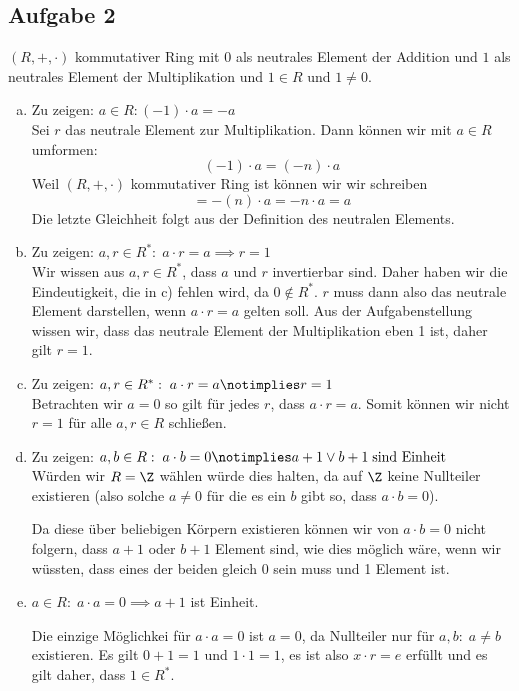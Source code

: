 \subsection*{Aufgabe 2}
$(R, +, \cdot)$ kommutativer Ring mit $0$ als neutrales Element der Addition und $1$ als neutrales Element der Multiplikation und $1 \in R$ und $1 \neq 0$.

\begin{enumerate}[a)]
  \item Zu zeigen: $a \in R: (-1) \cdot a = -a$ \\

  Sei $r$ das neutrale Element zur Multiplikation. Dann können wir mit $a \in R$ umformen:
  \[ (-1) \cdot a = (-n) \cdot a \]
  Weil $(R, +, \cdot)$ kommutativer Ring ist können wir wir schreiben
  \[
    = -(n) \cdot a = -n \cdot a = a
  \]
  Die letzte Gleichheit folgt aus der Definition des neutralen Elements.

  \item Zu zeigen: $  a,r \in R^{*}: \; a \cdot r = a \implies r = 1$ \\

  Wir wissen aus $a, r \in R^{*}$, dass $a$ und $r$ invertierbar sind. Daher haben wir die Eindeutigkeit, die in c) fehlen wird, da $0 \notin R^{*}$. $r$ muss dann also das neutrale Element darstellen, wenn $a \cdot r = a$ gelten soll. Aus der Aufgabenstellung wissen wir, dass das neutrale Element der Multiplikation eben 1 ist, daher gilt $r=1$.

  \item Zu zeigen: $  a,r \in R^{*}: \; a \cdot r = a \notimplies r = 1$ \\

  Betrachten wir $a=0$ so gilt für jedes $r$, dass $a \cdot r = a$. Somit können wir nicht $r=1$ für alle $a, r \in R$ schließen.

  \item Zu zeigen: $a, b \in R: \; a \cdot b = 0 \notimplies a + 1 \lor b+1 \; \text{sind Einheit}$ \\

  Würden wir $R = \Z$ wählen würde dies halten, da auf $\Z$ keine Nullteiler existieren (also solche $a \neq 0$ für die es ein $b$ gibt so, dass $a \cdot b = 0$).

  Da diese über beliebigen Körpern existieren können wir von $a \cdot b = 0$ nicht folgern, dass $a+1$ oder $b+1$ Element sind, wie dies möglich wäre, wenn wir wüssten, dass eines der beiden gleich 0 sein muss und 1 Element ist.

  \item $a \in R: \; a \cdot a = 0 \implies a+1$ ist Einheit.

  Die einzige Möglichkei für $a \cdot a = 0$ ist $a = 0$, da Nullteiler nur für $a, b: \; a \neq b$ existieren. Es gilt $0+1 = 1$ und $1 \cdot 1 = 1$, es ist also $x \cdot r = e$ erfüllt und es gilt daher, dass $1 \in R^{*}$.





\end{enumerate}



